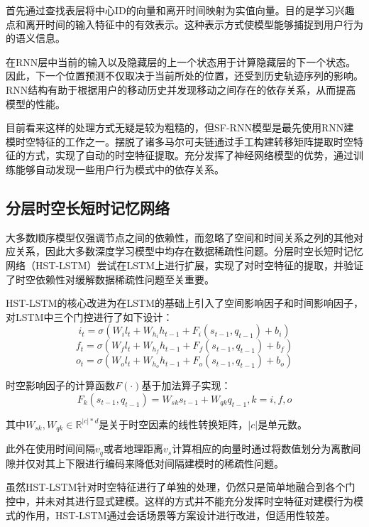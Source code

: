 \documentclass[master]{thesis-uestc}
\begin{document}
首先通过查找表层将中心ID的向量和离开时间映射为实值向量。目的是学习兴趣点和离开时间的输入特征中的有效表示。这种表示方式使模型能够捕捉到用户行为的语义信息。

在RNN层中当前的输入以及隐藏层的上一个状态用于计算隐藏层的下一个状态。因此，下一个位置预测不仅取决于当前所处的位置，还受到历史轨迹序列的影响。RNN结构有助于根据用户的移动历史并发现移动之间存在的依存关系，从而提高模型的性能。

目前看来这样的处理方式无疑是较为粗糙的，但SF-RNN模型是最先使用RNN建模时空特征的工作之一。摆脱了诸多马尔可夫链通过手工构建转移矩阵提取时空特征的方式，实现了自动的时空特征提取。充分发挥了神经网络模型的优势，通过训练能够自动发现一些用户行为模式中的依存关系。

\subsection{分层时空长短时记忆网络}
大多数顺序模型仅强调节点之间的依赖性，而忽略了空间和时间关系之列的其他对应关系，因此大多数深度学习模型中均存在数据稀疏性问题。分层时空长短时记忆网络（HST-LSTM）尝试在LSTM上进行扩展，实现了对时空特征的提取，并验证了时空依赖性对缓解数据稀疏性问题至关重要。

HST-LSTM的核心改进为在LSTM的基础上引入了空间影响因子和时间影响因子，对LSTM中三个门控进行了如下设计：
\begin{equation}
   i_t= \sigma(W_{i}l_t + W_{h_i}h_{t-1} + F_i(s_{t-1}, q_{t-1}) + b_i)
\end{equation}
\begin{equation}
   f_t= \sigma(W_{f}l_t + W_{h_f}h_{t-1} + F_f(s_{t-1}, q_{t-1}) + b_f)
\end{equation}
\begin{equation}
   o_t= \sigma(W_{o}l_t + W_{h_o}h_{t-1} + F_o(s_{t-1}, q_{t-1}) + b_o)
\end{equation}

时空影响因子的计算函数$F(\cdot)$基于加法算子实现：
\begin{equation}
   F_k(s_{t-1},q_{t-1})=W_{sk}s_{t-1} + W_{qk}q_{t-1},k=i,f,o
\end{equation}

其中$W_{sk},W_{qk} \in \mathbb{R}^{|c|*d}$是关于时空因素的线性转换矩阵，$|c|$是单元数。

此外在使用时间间隔$v_q$或者地理距离$v_s$计算相应的向量时通过将数值划分为离散间隙并仅对其上下限进行编码来降低对间隔建模时的稀疏性问题。

虽然HST-LSTM针对时空特征进行了单独的处理，仍然只是简单地融合到各个门控中，并未对其进行显式建模。这样的方式并不能充分发挥时空特征对建模行为模式的作用，HST-LSTM通过会话场景等方案设计进行改进，但适用性较差。
\end{document}
